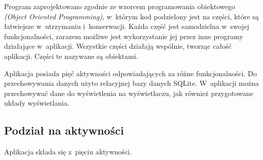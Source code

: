 \documentclass[a4paper,12pt, twoside]{article}
\begin{document}
    	Program zaprojektowano zgodnie ze wzorcem programowania obiektowego \textit{(Object Oriented Programming)}\cite{oop}, w~którym kod podzielony jest na części, które są łatwiejsze w~utrzymaniu i~konserwacji. Każda część jest samodzielna w~swojej funkcjonalności, zarazem możliwe jest wykorzystanie jej przez inne programy działające w~aplikacji. Wszystkie części działają wspólnie, tworząc całość aplikacji. Części te nazywane są obiektami. 
    	
    	Aplikacja posiada pięć aktywności odpowiadających za różne funkcjonalności. Do przechowywania danych użyto relacyjnej bazy danych SQLite. W~aplikacji można przechowywać dane do wyświetlenia na wyświetlaczu, jak również przygotowane układy wyświetlania.
    	\newpage
    	\subsection{Podział na aktywności}
    	\label{podzialnaaktywnosci}
    	Aplikacja składa się z~pięciu aktywności.
\end{document}
